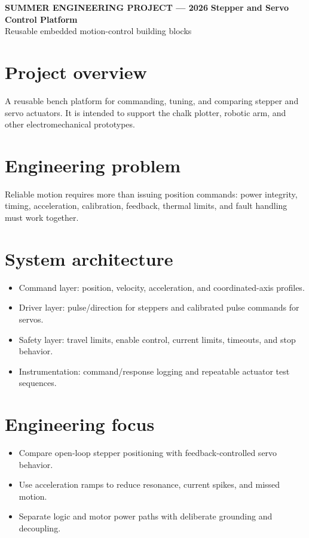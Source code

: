 \documentclass[10pt]{article}
\begin{document}
{\color{blue}\small\bfseries SUMMER ENGINEERING PROJECT --- 2026}
\vspace{0.4em}
{\color{navy}\LARGE\bfseries Stepper and Servo Control Platform}\\
{\color{muted}\large Reusable embedded motion-control building blocks}

\section*{Project overview}
A reusable bench platform for commanding, tuning, and comparing stepper and servo actuators. It is intended to support the chalk plotter, robotic arm, and other electromechanical prototypes.

\section*{Engineering problem}
Reliable motion requires more than issuing position commands: power integrity, timing, acceleration, calibration, feedback, thermal limits, and fault handling must work together.

\section*{System architecture}
\begin{itemize}
\item Command layer: position, velocity, acceleration, and coordinated-axis profiles.
\item Driver layer: pulse/direction for steppers and calibrated pulse commands for servos.
\item Safety layer: travel limits, enable control, current limits, timeouts, and stop behavior.
\item Instrumentation: command/response logging and repeatable actuator test sequences.
\end{itemize}

\section*{Engineering focus}
\begin{itemize}
\item Compare open-loop stepper positioning with feedback-controlled servo behavior.
\item Use acceleration ramps to reduce resonance, current spikes, and missed motion.
\item Separate logic and motor power paths with deliberate grounding and decoupling.
\end{itemize}
\end{document}
